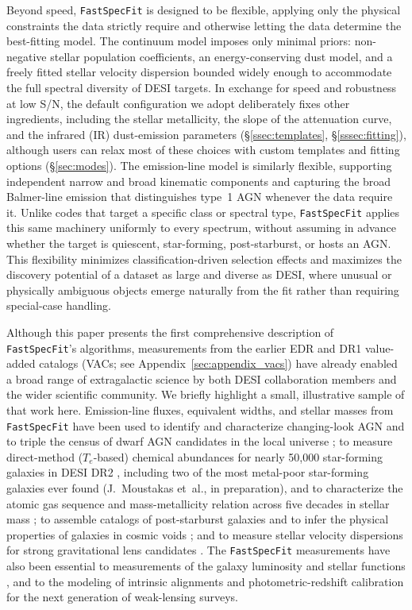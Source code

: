 \documentclass[modern,linenumbers]{aastex702}
\newcommand{\fastspecfit}{\texttt{FastSpecFit}}
\begin{document}
Beyond speed, \fastspecfit{} is designed to be flexible, applying only
the physical constraints the data strictly require and otherwise
letting the data determine the best-fitting model. The continuum model
imposes only minimal priors: non-negative stellar population
coefficients, an energy-conserving dust model, and a freely fitted
stellar velocity dispersion bounded widely enough to accommodate the
full spectral diversity of DESI targets. In exchange for speed and
robustness at low S/N, the default configuration we adopt deliberately
fixes other ingredients, including the stellar metallicity, the slope
of the attenuation curve, and the infrared (IR) dust-emission
parameters (\S\ref{ssec:templates}, \S\ref{sssec:fitting}), although
users can relax most of these choices with custom templates and
fitting options (\S\ref{sec:modes}). The emission-line model is
similarly flexible, supporting independent narrow and broad kinematic
components and capturing the broad Balmer-line emission that
distinguishes type~1 AGN whenever the data require it. Unlike codes
that target a specific class or spectral type, \fastspecfit{} applies
this same machinery uniformly to every spectrum, without assuming in
advance whether the target is quiescent, star-forming, post-starburst,
or hosts an AGN. This flexibility minimizes classification-driven
selection effects and maximizes the discovery potential of a dataset
as large and diverse as DESI, where unusual or physically ambiguous
objects emerge naturally from the fit rather than requiring
special-case handling.

Although this paper presents the first comprehensive description of
\fastspecfit{}'s algorithms, measurements from the earlier EDR and DR1
value-added catalogs (VACs; see Appendix~\ref{sec:appendix_vacs}) have
already enabled a broad range of extragalactic science by both DESI
collaboration members and the wider scientific community. We briefly
highlight a small, illustrative sample of that work
here. Emission-line fluxes, equivalent widths, and stellar masses from
\fastspecfit{} have been used to identify and characterize
changing-look AGN \citep{guo25a} and to triple the census of dwarf AGN
candidates in the local universe \citep{pucha25a}; to measure
direct-method ($T_e$-based) chemical abundances for nearly 50,000
star-forming galaxies in DESI DR2 \citep{scholte26a}, including two of
the most metal-poor star-forming galaxies ever found (J.~Moustakas
et~al., in preparation), and to characterize the atomic gas sequence
and mass-metallicity relation across five decades in stellar mass
\citep{scholte24a}; to assemble catalogs of post-starburst galaxies
\citep{soto25a} and to infer the physical properties of galaxies in
cosmic voids \citep{rincon25a}; and to measure stellar velocity
dispersions for strong gravitational lens candidates
\citep{huang25a}. The \fastspecfit{} measurements have also been
essential to measurements of the galaxy luminosity and stellar
functions \citep{wang25a, moore26a}, and to the modeling of intrinsic
alignments \citep{siegel25a} and photometric-redshift calibration
\citep{blanco25a} for the next generation of weak-lensing surveys.
\end{document}
